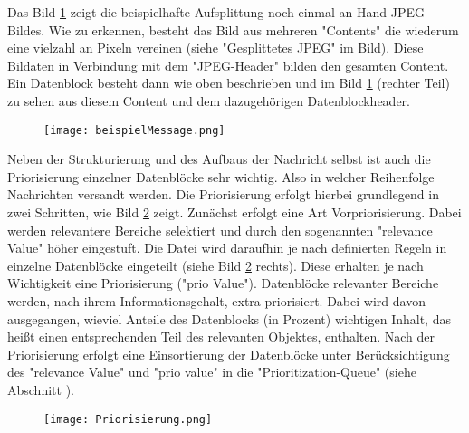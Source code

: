 

Das Bild \ref{fig:beispielJPG} zeigt die beispielhafte Aufsplittung noch einmal
an Hand JPEG Bildes. Wie zu erkennen, besteht das Bild aus mehreren "Contents"
die wiederum eine vielzahl an Pixeln vereinen (siehe "Gesplittetes JPEG" im
Bild). Diese Bildaten in Verbindung mit dem "JPEG-Header" bilden den gesamten
Content. Ein Datenblock besteht dann wie oben beschrieben und im Bild
\ref{fig:beispielJPG} (rechter Teil) zu sehen aus diesem Content und dem
dazugehörigen Datenblockheader.

\begin{figure}[H]
	\centering
	\texttt{[image: beispielMessage.png]}
	\label{fig:beispielJPG}
\end{figure}

Neben der Strukturierung und des Aufbaus der Nachricht selbst ist auch die
Priorisierung einzelner Datenblöcke sehr wichtig. Also in welcher Reihenfolge
Nachrichten versandt werden. Die Priorisierung erfolgt hierbei grundlegend in
zwei Schritten, wie Bild \ref{fig:priorisierungen} zeigt. Zunächst erfolgt eine
Art Vorpriorisierung. Dabei werden relevantere Bereiche selektiert und durch den
sogenannten "relevance Value" höher eingestuft. Die Datei wird daraufhin je nach
definierten Regeln in einzelne Datenblöcke eingeteilt (siehe Bild
\ref{fig:priorisierungen} rechts). Diese erhalten je nach Wichtigkeit eine
Priorisierung ("prio Value"). Datenblöcke relevanter Bereiche werden, nach ihrem
Informationsgehalt, extra priorisiert. Dabei wird davon ausgegangen, wieviel
Anteile des Datenblocks (in Prozent) wichtigen Inhalt, das heißt einen
entsprechenden Teil des relevanten Objektes, enthalten. Nach der Priorisierung
erfolgt eine Einsortierung der Datenblöcke unter Berücksichtigung des "relevance
Value" und "prio value" in die "Prioritization-Queue" (siehe Abschnitt
). 

\begin{figure}[H]
	\centering
	\texttt{[image: Priorisierung.png]}
	\label{fig:priorisierungen}
\end{figure}
